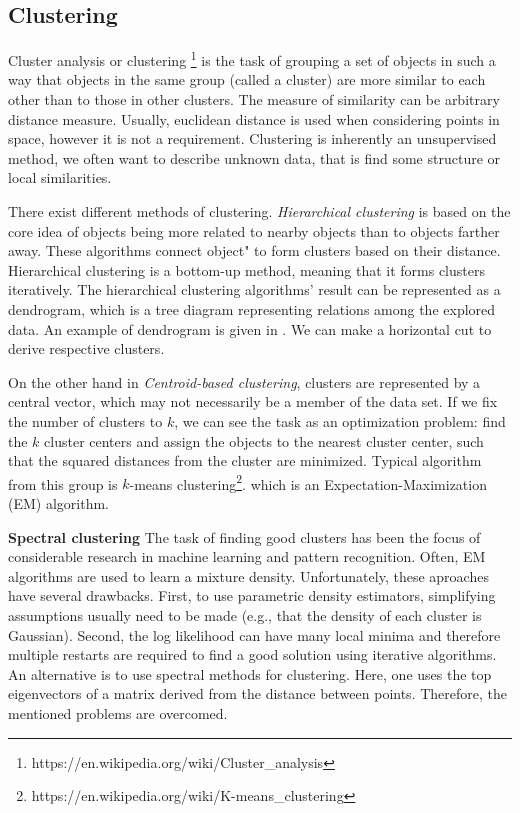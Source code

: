 \subsection{Clustering}
Cluster analysis or clustering \footnote{https://en.wikipedia.org/wiki/Cluster\_analysis} is the task of grouping a set of objects in such a way that objects in the same group (called a cluster) are more similar to each other than to those in other clusters.
The measure of similarity can be arbitrary distance measure.
Usually, euclidean distance is used when considering points in space, however it is not a requirement.
Clustering is inherently an unsupervised method, we often want to describe unknown data, that is find some structure or local similarities.
\par
There exist different methods of clustering.
\textit{Hierarchical clustering} is based on the core idea of objects being more related to nearby objects than to objects farther away.
These algorithms connect object" to form clusters based on their distance.
Hierarchical clustering is a bottom-up method, meaning that it forms clusters iteratively.
The hierarchical clustering algorithms' result can be represented as a dendrogram, which is a tree diagram representing relations among the explored data.
An example of dendrogram is given in .
We can make a horizontal cut to derive respective clusters.
\par
On the other hand in \textit{Centroid-based clustering}, clusters are represented by a central vector, which may not necessarily be a member of the data set.
If we fix the number of clusters to $k$, we can see the task as an optimization problem: find the $k$ cluster centers and assign the objects to the nearest cluster center, such that the squared distances from the cluster are minimized.
Typical algorithm from this group is $k$-means clustering\footnote{https://en.wikipedia.org/wiki/K-means\_clustering}. which is an Expectation-Maximization (EM) algorithm.
\par
\textbf{Spectral clustering} \cite{ng2002spectral}
The task of finding good clusters has been the focus of considerable research in machine learning and pattern recognition.
Often, EM algorithms are used to learn a mixture density.
Unfortunately, these aproaches have several drawbacks.
First, to use parametric density estimators, simplifying assumptions usually need to be made (e.g., that the density of each cluster is Gaussian).
Second, the log likelihood can have many local minima and therefore multiple restarts are required to find a good solution using iterative algorithms. 
An alternative is to use spectral methods for clustering.
Here, one uses the top eigenvectors of a matrix derived from the distance between points.
Therefore, the mentioned problems are overcomed.
\pagebreak
